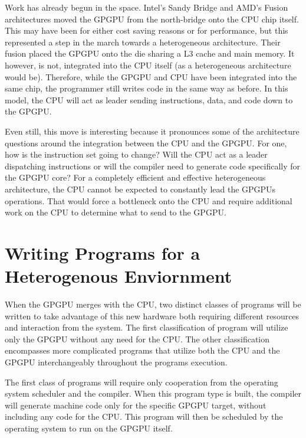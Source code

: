 Work has already begun in the space. Intel's Sandy Bridge \cite{tlpcache} and AMD's Fusion \cite{cpuassist} architectures moved the GPGPU from the north-bridge onto the CPU chip itself.\cite{tlpcache} This may have been for either cost saving reasons or for performance, but this represented a step in the march towards a heterogeneous architecture. Their fusion placed the GPGPU onto the die sharing a L3 cache and main memory. It however, is not, integrated into the CPU itself (as a heterogeneous architecture would be). Therefore, while the GPGPU and CPU have been integrated into the same chip, the programmer still writes code in the same way as before. In this model, the CPU will act as leader sending instructions, data, and code down to the GPGPU. 

Even still, this move is interesting because it pronounces some of the architecture questions around the integration between the CPU and the GPGPU. For one, how is the instruction set going to change? Will the CPU act as a leader dispatching instructions or will the compiler need to generate code specifically for the GPGPU core? For a completely efficient and effective heterogeneous architecture, the CPU cannot be expected to constantly lead the GPGPUs operations. That would force a bottleneck onto the CPU and require additional work on the CPU to determine what to send to the GPGPU. 


\section*{Writing Programs for a Heterogenous Enviornment}

When the GPGPU merges with the CPU, two distinct classes of programs will be written to take advantage of this new hardware both requiring different resources and interaction from the system. The first classification of program will utilize only the GPGPU without any need for the CPU. The other classification encompasses more complicated programs that utilize both the CPU and the GPGPU interchangeably throughout the programs execution. 

The first class of programs will require only cooperation from the operating system scheduler and the compiler. When this program type is built, the compiler will generate machine code only for the specific GPGPU target, without including any code for the CPU. This program will then be scheduled by the operating system to run on the GPGPU itself. 

